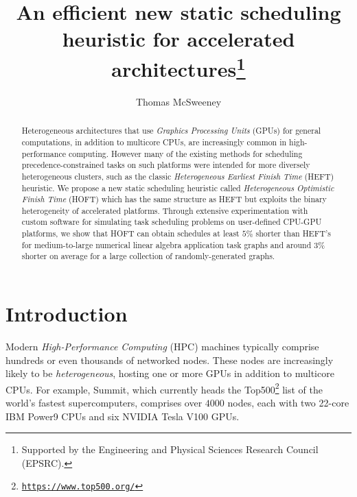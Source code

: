 \documentclass[runningheads]{llncs}
\begin{document}
%
\title{An efficient new static scheduling heuristic for accelerated architectures\thanks{Supported by the Engineering and Physical Sciences Research Council (EPSRC).}}
%
%
\author{Thomas McSweeney }
%
%
%
\maketitle              %
%
\begin{abstract}

Heterogeneous architectures that use {\em Graphics Processing Units} (GPUs) for general computations, in addition to multicore CPUs, are increasingly common in high-performance computing. However many of the existing methods for scheduling precedence-constrained tasks on such platforms were intended for more diversely heterogeneous clusters, such as the classic {\em Heterogeneous Earliest Finish Time} (HEFT) heuristic. We propose a new static scheduling heuristic called {\em Heterogeneous Optimistic Finish Time} (HOFT) which has the same structure as HEFT but exploits the binary heterogeneity of accelerated platforms. Through extensive experimentation with custom software for simulating task scheduling problems on user-defined CPU-GPU platforms, we show that HOFT can obtain schedules at least $5\%$ shorter than HEFT's for medium-to-large numerical linear algebra application task graphs and around $3\%$ shorter on average for a large collection of randomly-generated graphs.   


\end{abstract}


\section{Introduction}
\label{sect.intro}

Modern {\em High-Performance Computing} (HPC) machines typically comprise hundreds or even thousands of networked nodes. These nodes are increasingly likely to be {\em heterogeneous}, hosting one or more GPUs in addition to multicore CPUs. For example, Summit, which currently heads the Top500\footnote{\href{https://www.top500.org/}{{\tt \small https://www.top500.org/}}} list of the world's fastest supercomputers, comprises over $4000$ nodes, each with two 22-core IBM Power9 CPUs and six NVIDIA Tesla V100 GPUs. 
\end{document}
